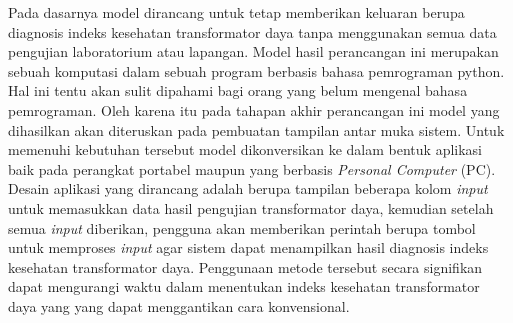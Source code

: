 
Pada dasarnya model dirancang untuk tetap memberikan keluaran berupa diagnosis indeks kesehatan transformator daya tanpa menggunakan semua data pengujian laboratorium atau lapangan. Model hasil perancangan ini merupakan sebuah komputasi dalam sebuah program berbasis bahasa pemrograman python. Hal ini tentu akan sulit dipahami bagi orang yang belum mengenal bahasa pemrograman. Oleh karena itu pada tahapan akhir perancangan ini model yang dihasilkan akan diteruskan pada pembuatan tampilan antar muka sistem. Untuk memenuhi kebutuhan tersebut model dikonversikan ke dalam bentuk aplikasi baik pada perangkat portabel maupun yang berbasis \textit{Personal Computer} (PC). Desain aplikasi yang dirancang adalah berupa tampilan beberapa kolom \textit{input} untuk memasukkan data hasil pengujian transformator daya, kemudian setelah semua \textit{input} diberikan, pengguna akan memberikan perintah berupa tombol untuk memproses \textit{input} agar sistem dapat menampilkan hasil diagnosis indeks kesehatan transformator daya. Penggunaan metode tersebut secara signifikan dapat mengurangi waktu dalam menentukan indeks kesehatan transformator daya yang yang dapat menggantikan cara konvensional. \par






%
%








